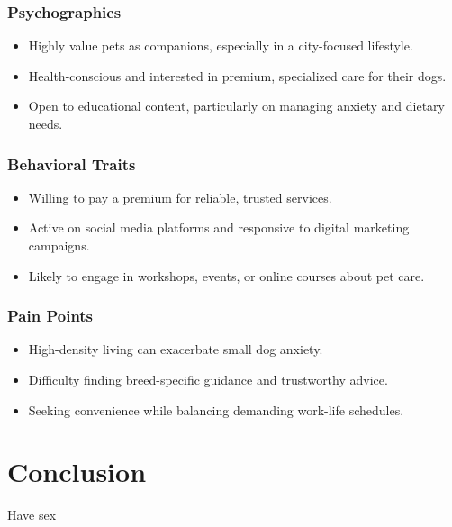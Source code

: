 \documentclass{businessdoc}
\begin{document}
\subsubsection{Psychographics}
\begin{itemize}
    \item Highly value pets as companions, especially in a city-focused lifestyle.
    \item Health-conscious and interested in premium, specialized care for their dogs.
    \item Open to educational content, particularly on managing anxiety and dietary needs.
\end{itemize}

\subsubsection{Behavioral Traits}
\begin{itemize}
    \item Willing to pay a premium for reliable, trusted services.
    \item Active on social media platforms and responsive to digital marketing campaigns.
    \item Likely to engage in workshops, events, or online courses about pet care.
\end{itemize}

\subsubsection{Pain Points}
\begin{itemize}
    \item High-density living can exacerbate small dog anxiety.
    \item Difficulty finding breed-specific guidance and trustworthy advice.
    \item Seeking convenience while balancing demanding work-life schedules.
\end{itemize}


\section{Conclusion}
Have sex
\end{document}
